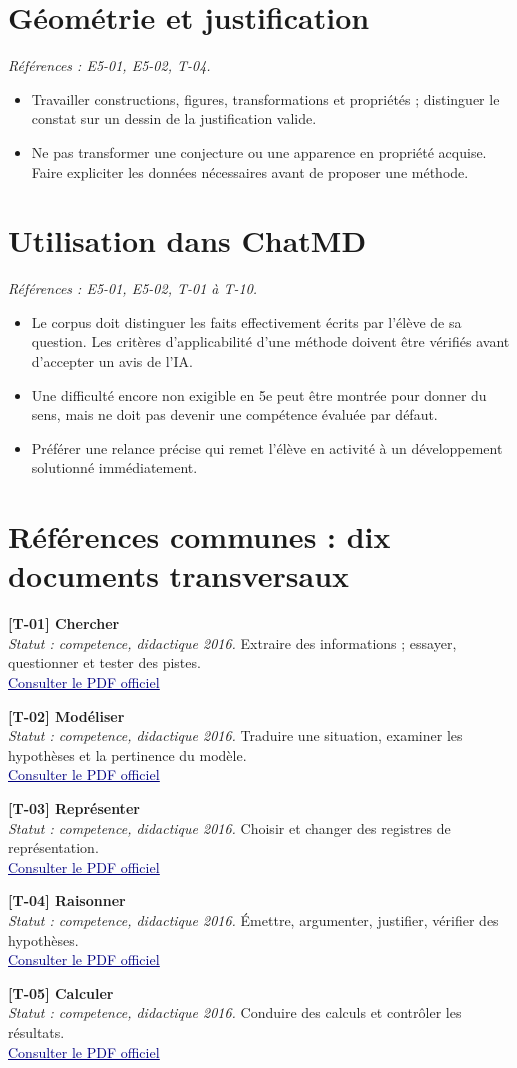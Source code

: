\documentclass[11pt,a4paper]{article}
\newcommand{\refsource}[1]{\textsf{\textcolor{slate}{[#1]}}}
\newcommand{\sectionref}[2]{\section{#1}\textit{Références : #2.}\par}
\newcommand{\entreesource}[5]{\par\noindent\textbf{\refsource{#1} #2}\\[-2pt]\textit{Statut : #3.} #4\\[-2pt]\href{#5}{\textcolor{navy}{\underline{Consulter le PDF officiel}}}\par\smallskip}
\begin{document}
\sectionref{Géométrie et justification}{E5-01, E5-02, T-04}
\begin{itemize}
\item Travailler constructions, figures, transformations et propriétés ; distinguer le constat sur un dessin de la justification valide.
\item Ne pas transformer une conjecture ou une apparence en propriété acquise. Faire expliciter les données nécessaires avant de proposer une méthode.
\end{itemize}
\sectionref{Utilisation dans ChatMD}{E5-01, E5-02, T-01 à T-10}
\begin{itemize}
\item Le corpus doit distinguer les faits effectivement écrits par l’élève de sa question. Les critères d’applicabilité d’une méthode doivent être vérifiés avant d’accepter un avis de l’IA.
\item Une difficulté encore non exigible en 5e peut être montrée pour donner du sens, mais ne doit pas devenir une compétence évaluée par défaut.
\item Préférer une relance précise qui remet l’élève en activité à un développement solutionné immédiatement.
\end{itemize}
\section{Références communes : dix documents transversaux}
\entreesource{T-01}{Chercher}{competence, didactique 2016}{Extraire des informations ; essayer, questionner et tester des pistes.}{https://eduscol.education.gouv.fr/sites/default/files/document/ra16c4mathchercher552125pdf-77583.pdf}

\entreesource{T-02}{Modéliser}{competence, didactique 2016}{Traduire une situation, examiner les hypothèses et la pertinence du modèle.}{https://eduscol.education.gouv.fr/sites/default/files/document/ra16c4mathmodelisernd566177pdf-77586.pdf}

\entreesource{T-03}{Représenter}{competence, didactique 2016}{Choisir et changer des registres de représentation.}{https://eduscol.education.gouv.fr/sites/default/files/document/ra16c4mathrepresenternd566207pdf-77589.pdf}

\entreesource{T-04}{Raisonner}{competence, didactique 2016}{Émettre, argumenter, justifier, vérifier des hypothèses.}{https://eduscol.education.gouv.fr/sites/default/files/document/ra16c4mathraisonner547836pdf-77592.pdf}

\entreesource{T-05}{Calculer}{competence, didactique 2016}{Conduire des calculs et contrôler les résultats.}{https://eduscol.education.gouv.fr/sites/default/files/document/ra16c4mathcompcalculer554370pdf-77595.pdf}
\end{document}
